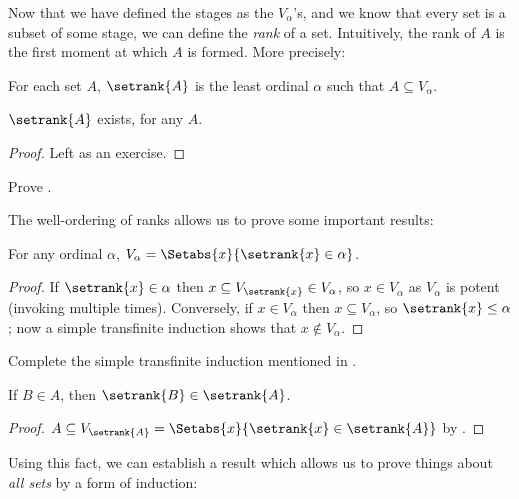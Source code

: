 \documentclass[../../../include/open-logic-section]{subfiles}
\begin{document}

Now that we have defined the stages as the $V_\alpha$'s, and we know
that every set is a subset of some stage, we can define the
\emph{rank} of a set. Intuitively, the rank of $A$ is the first moment
at which $A$ is formed. More precisely:

\begin{defn}
For each set $A$, $\setrank{A}$ is the least ordinal $\alpha$ such that $A
\subseteq V_\alpha$.
\end{defn}
\begin{prop}
	$\setrank{A}$ exists, for any $A$.
\end{prop}
\begin{proof}
	Left as an exercise.
\end{proof}
\begin{prob}
	Prove .	
\end{prob}
\noindent 
The well-ordering of ranks allows us to prove some important results:
\begin{prop}
For any ordinal $\alpha$, $V_\alpha = \Setabs{x}{\setrank{x} \in \alpha}$.
\end{prop}

\begin{proof}
If $\setrank{x} \in \alpha$ then $x \subseteq V_{\setrank{x}} \in
V_\alpha$, so $x \in V_\alpha$ as $V_\alpha$ is potent (invoking
 multiple times). Conversely, if $x \in V_\alpha$ then $x \subseteq V_\alpha$, so $\setrank{x} \leq \alpha$; now a simple transfinite induction shows that $x \notin V_\alpha$. 
\end{proof}
\begin{prob}
	Complete the simple transfinite induction mentioned in .
\end{prob}

\begin{prop}
If $B \in A$, then $\setrank{B} \in \setrank{A}$.
\end{prop}

\begin{proof}
$A \subseteq V_{\setrank{A}} = \Setabs{x}{\setrank{x} \in
\setrank{A}}$ by .
\end{proof}
\noindent
Using this fact, we can establish a result which allows us to prove
things about \emph{all sets} by a form of induction:
\end{document}
